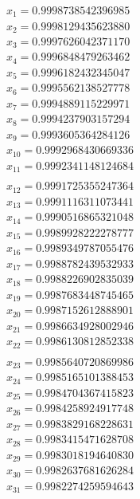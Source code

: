 \begin{multicols}{3}
	\begin{align*}
		x_{1}  = 0.9998738542396985\\
		x_{2}  = 0.9998129435623880\\
		x_{3}  = 0.9997626042371170\\
		x_{4}  = 0.9996848479263462\\
		x_{5}  = 0.9996182432345047\\
		x_{6}  = 0.9995562138527778\\
		x_{7}  = 0.9994889115229971\\
		x_{8}  = 0.9994237903157294\\
		x_{9}  = 0.9993605364284126\\
		x_{10} = 0.9992968430669336\\
		x_{11} = 0.9992341148124684\\
	\end{align*}
	\vfill
	\columnbreak
	\begin{align*}
		x_{12} = 0.9991725355247364\\
		x_{13} = 0.9991116311073441\\
		x_{14} = 0.9990516865321048\\
		x_{15} = 0.9989928222278777\\
		x_{16} = 0.9989349787055476\\
		x_{17} = 0.9988782439532933\\
		x_{18} = 0.9988226902835039\\
		x_{19} = 0.9987683448745465\\
		x_{20} = 0.9987152612888901\\
		x_{21} = 0.9986634928002946\\
		x_{22} = 0.9986130812852338\\
	\end{align*}
	\vfill
	\columnbreak
	\begin{align*}
		x_{23} = 0.9985640720869986\\
		x_{24} = 0.9985165101388453\\
		x_{25} = 0.9984704367415823\\
		x_{26} = 0.9984258924917748\\
		x_{27} = 0.9983829168228631\\
		x_{28} = 0.9983415471628708\\
		x_{29} = 0.9983018194640830\\
		x_{30} = 0.9982637681626284\\
		x_{31} = 0.9982274259594643\\

\end{align*}
\end{multicols}
